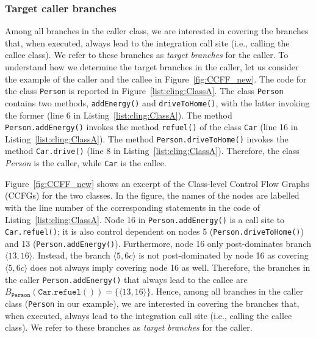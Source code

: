 \subsubsection{Target caller branches}
Among all branches in the caller class, we are interested in covering the branches that, when executed, always lead to the integration call site (i.e., calling the callee class). We refer to these branches as \textit{target branches} for the caller.
To understand how we determine the target branches in the caller, 
let us consider the example of the caller and the callee in Figure~\ref{fig:CCFF_new}. The code for the class \texttt{Person} is reported in Figure~\ref{list:cling:ClassA}. The class \texttt{Person} contains two methods, \texttt{addEnergy()} and \texttt{driveToHome()}, with the latter invoking the former (line 6 in Listing~\ref{list:cling:ClassA}). The method \texttt{Person.addEnergy()} invokes the method \texttt{refuel()} of the class \texttt{Car} (line 16 in Listing~\ref{list:cling:ClassA}). The method \texttt{Person.driveToHome()} invokes the method \texttt{Car.drive()} (line 8 in Listing~\ref{list:cling:ClassA}). Therefore, the class \textit{Person} is the caller, while \texttt{Car} is the callee. 

Figure~\ref{fig:CCFF_new} shows an excerpt of the Class-level Control Flow Graphs (CCFGs) for the two classes. In the figure, the names of the nodes are labelled with the line number of the corresponding statements in the code of Listing~\ref{list:cling:ClassA}. Node 16 in \texttt{Person.addEnergy()} is a call site to \texttt{Car.refuel()}; it is also control dependent on nodes 5 (\texttt{Person.driveToHome()}) and 13 (\texttt{Person.addEnergy()}). Furthermore, node 16 only post-dominates branch $\langle 13,16\rangle$. Instead, the branch $\langle 5,6c\rangle$ is not post-dominated by  node 16 as covering $\langle 5,6c\rangle$ does not always imply covering node 16 as well. Therefore, the branches in the caller \texttt{Person.addEnergy()} that always lead to the callee are $B_{\mathtt{Person}}(\mathtt{Car.refuel()})=\{\langle 13,16\rangle\}$. 
Hence, among all branches in the caller class (\texttt{Person} in our example), we are interested in covering the branches that, when executed, always lead to the integration call site (i.e., calling the callee class). We refer to these branches as \textit{target branches} for the caller.
 
